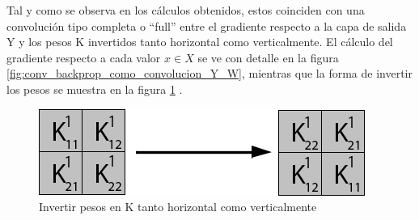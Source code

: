 Tal y como se observa en los cálculos obtenidos, estos coinciden con una convolución tipo completa o ``full'' entre el gradiente respecto a la capa de salida Y y los pesos K invertidos tanto horizontal como verticalmente. El cálculo del gradiente respecto a cada valor $x \in X$ se ve con detalle en la figura \ref{fig:conv_backprop_como_convolucion_Y_W}, mientras que la forma de invertir los pesos se muestra en la figura \ref{fig:flip_W} \cite{conv_backprop}.

\begin{figure}[H]
	\centering
	\includegraphics[width=0.8\linewidth]{imagenes/flip_pesos.jpg}  
	\caption{Invertir pesos en K tanto horizontal como verticalmente}
	\label{fig:flip_W}
\end{figure}

